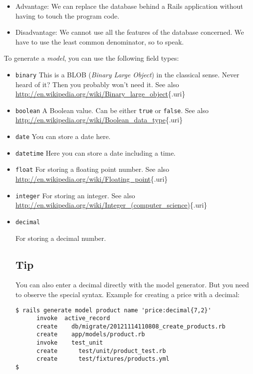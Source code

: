 \documentclass[a4paper]{book}
\newcounter{tab}[chapter]
\begin{document}
\begin{itemize}
\itemsep1pt\parskip0pt
\item
  Advantage: We can replace the database behind a Rails application without having to touch the program code.
\item
  Disadvantage: We cannot use all the features of the database concerned. We have to use the least common denominator, so to speak.
\end{itemize}

To generate a \emph{model}, you can use the following field types:

\begin{itemize}
\item
  \texttt{binary} This is a BLOB (\emph{Binary Large Object}) in the classical sense. Never heard of it? Then you probably won't need it. See also \url{http://en.wikipedia.org/wiki/Binary_large_object}\{.uri\}
\item
  \texttt{boolean} A Boolean value. Can be either \texttt{true} or \texttt{false}. See also \url{http://en.wikipedia.org/wiki/Boolean_data_type}\{.uri\}
\item
  \texttt{date} You can store a date here.
\item
  \texttt{datetime} Here you can store a date including a time.
\item
  \texttt{float} For storing a floating point number. See also \url{http://en.wikipedia.org/wiki/Floating_point}\{.uri\}
\item
  \texttt{integer} For storing an integer. See also \url{http://en.wikipedia.org/wiki/Integer_(computer_science)}\{.uri\}
\item
  \texttt{decimal}

  For storing a decimal number.

  \subsection{Tip}\label{tip-6}

  You can also enter a decimal directly with the model generator. But you need to observe the special syntax. Example for creating a price with a decimal:

\begin{shaded}\begin{verbatim}
$ rails generate model product name 'price:decimal{7,2}'
      invoke  active_record
      create    db/migrate/20121114110808_create_products.rb
      create    app/models/product.rb
      invoke    test_unit
      create      test/unit/product_test.rb
      create      test/fixtures/products.yml
$
\end{verbatim}\end{shaded}


\end{itemize}
\end{document}
